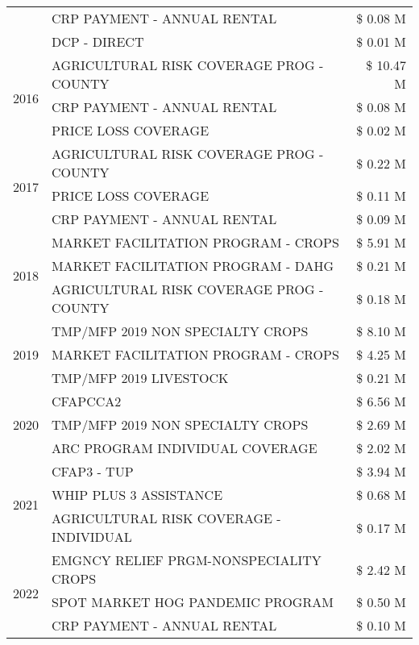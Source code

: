 \begin{tabular}{llr}
 & CRP PAYMENT - ANNUAL RENTAL & \$ 0.08 M \\
 & DCP - DIRECT & \$ 0.01 M \\
\cline{1-3}
\multirow[t]{3}{*}{2016} & AGRICULTURAL RISK COVERAGE PROG - COUNTY & \$ 10.47 M \\
 & CRP PAYMENT - ANNUAL RENTAL & \$ 0.08 M \\
 & PRICE LOSS COVERAGE & \$ 0.02 M \\
\cline{1-3}
\multirow[t]{3}{*}{2017} & AGRICULTURAL RISK COVERAGE PROG - COUNTY & \$ 0.22 M \\
 & PRICE LOSS COVERAGE & \$ 0.11 M \\
 & CRP PAYMENT - ANNUAL RENTAL & \$ 0.09 M \\
\cline{1-3}
\multirow[t]{3}{*}{2018} & MARKET FACILITATION PROGRAM - CROPS & \$ 5.91 M \\
 & MARKET FACILITATION PROGRAM - DAHG & \$ 0.21 M \\
 & AGRICULTURAL RISK COVERAGE PROG - COUNTY & \$ 0.18 M \\
\cline{1-3}
\multirow[t]{3}{*}{2019} & TMP/MFP 2019 NON SPECIALTY CROPS & \$ 8.10 M \\
 & MARKET FACILITATION PROGRAM - CROPS & \$ 4.25 M \\
 & TMP/MFP 2019 LIVESTOCK & \$ 0.21 M \\
\cline{1-3}
\multirow[t]{3}{*}{2020} & CFAPCCA2 & \$ 6.56 M \\
 & TMP/MFP 2019 NON SPECIALTY CROPS & \$ 2.69 M \\
 & ARC PROGRAM INDIVIDUAL COVERAGE & \$ 2.02 M \\
\cline{1-3}
\multirow[t]{3}{*}{2021} & CFAP3 - TUP & \$ 3.94 M \\
 & WHIP PLUS 3 ASSISTANCE & \$ 0.68 M \\
 & AGRICULTURAL RISK COVERAGE - INDIVIDUAL & \$ 0.17 M \\
\cline{1-3}
\multirow[t]{3}{*}{2022} & EMGNCY RELIEF PRGM-NONSPECIALITY CROPS & \$ 2.42 M \\
 & SPOT MARKET HOG PANDEMIC PROGRAM & \$ 0.50 M \\
 & CRP PAYMENT - ANNUAL RENTAL & \$ 0.10 M \\
\cline{1-3}
\bottomrule
\end{tabular}
